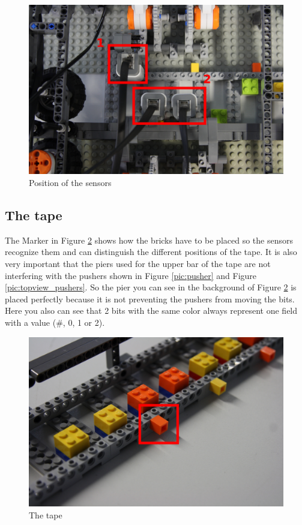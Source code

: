 \documentclass[%
  a4paper,%
  11pt,%
  blue,%
  hyperref	%
  ]{tubsartcl}
\begin{document}
\begin{figure}[!htb]
\begin{center}
\includegraphics[scale=0.3]{graphics_lego/sensors.jpg}
\end{center}
\caption{Position of the sensors}
\label{pic:sensors}
\end{figure}

\clearpage

\subsection{The tape}

The Marker in Figure \ref{pic:tape} shows how the bricks have to be placed so the sensors recognize them and can distinguish the different positions of the tape. It is also very important that the piers used for the upper bar of the tape are not interfering with the pushers shown in Figure \ref{pic:pusher} and Figure \ref{pic:topview_pushers}. So the pier you can see in the background of Figure \ref{pic:tape} is placed perfectly because it is not preventing the pushers from moving the bits.\\
Here you also can see that 2 bits with the same color always represent one field with a value (\#, 0, 1 or 2).

\begin{figure}[!htb]
\begin{center}
\includegraphics[scale=0.3]{graphics_lego/tape.jpg}
\end{center}
\caption{The tape}
\label{pic:tape}
\end{figure}
\end{document}
